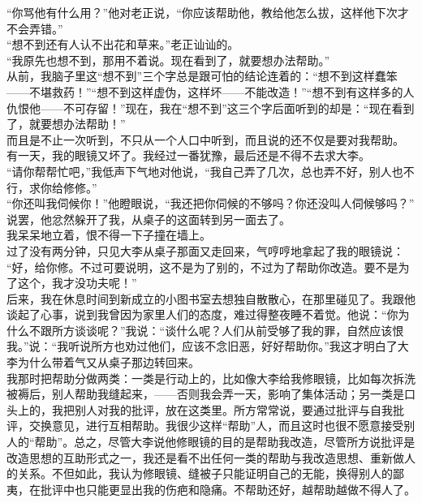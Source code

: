 “你骂他有什么用？”他对老正说，“你应该帮助他，教给他怎么拔，这样他下次才不会弄错。”\\

“想不到还有人认不出花和草来。”老正讪讪的。\\

“我原先也想不到，那用不着说。现在看到了，就要想办法帮助。”\\

从前，我脑子里这“想不到”三个字总是跟可怕的结论连着的：“想不到这样蠢笨——不堪救药！”“想不到这样虚伪，这样坏——不能改造！”“想不到有这样多的人仇恨他——不可存留！”现在，我在“想不到”这三个字后面听到的却是：“现在看到了，就要想办法帮助！”\\

而且是不止一次听到，不只从一个人口中听到，而且说的还不仅是要对我帮助。\\

有一天，我的眼镜又坏了。我经过一番犹豫，最后还是不得不去求大李。\\

“请你帮帮忙吧，”我低声下气地对他说，“我自己弄了几次，总也弄不好，别人也不行，求你给修修。”\\

“你还叫我伺候你！”他瞪眼说，“我还把你伺候的不够吗？你还没叫人伺候够吗？”\\

说罢，他忿然躲开了我，从桌子的这面转到另一面去了。\\

我呆呆地立着，恨不得一下子撞在墙上。\\

过了没有两分钟，只见大李从桌子那面又走回来，气哼哼地拿起了我的眼镜说：\\

“好，给你修。不过可要说明，这不是为了别的，不过为了帮助你改造。要不是为了这个，我才没功夫呢！”\\

后来，我在休息时间到新成立的小图书室去想独自散散心，在那里碰见了。我跟他谈起了心事，说到我曾因为家里人们的态度，难过得整夜睡不着觉。他说：“你为什么不跟所方谈谈呢？”我说：“谈什么呢？人们从前受够了我的罪，自然应该恨我。”说：“我听说所方也劝过他们，应该不念旧恶，好好帮助你。”我这才明白了大李为什么带着气又从桌子那边转回来。\\

我那时把帮助分做两类：一类是行动上的，比如像大李给我修眼镜，比如每次拆洗被褥后，别人帮助我缝起来，——否则我会弄一天，影响了集体活动；另一类是口头上的，我把别人对我的批评，放在这类里。所方常常说，要通过批评与自我批评，交换意见，进行互相帮助。我很少这样“帮助”人，而且这时也很不愿意接受别人的“帮助”。总之，尽管大李说他修眼镜的目的是帮助我改造，尽管所方说批评是改造思想的互助形式之一，我还是看不出任何一类的帮助与我改造思想、重新做人的关系。不但如此，我认为修眼镜、缝被子只能证明自己的无能，换得别人的鄙夷，在批评中也只能更显出我的伤疤和隐痛。不帮助还好，越帮助越做不得人了。\\

